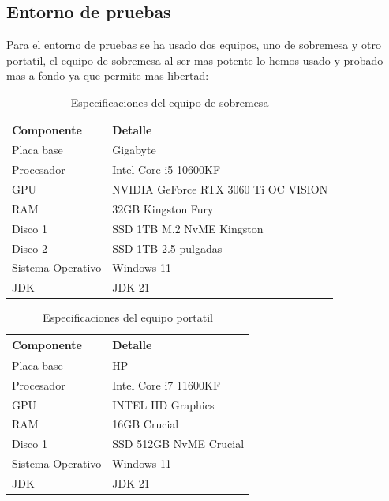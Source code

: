 \documentclass[a4paper]{article}
\begin{document}
\subsection{Entorno de pruebas}
Para el entorno de pruebas se ha usado dos equipos, uno de sobremesa y otro portatil, el equipo de sobremesa al ser mas potente lo hemos usado y probado mas a fondo ya que permite mas libertad: \\
\begin{table}[!htbp]
    \centering
    \caption{Especificaciones del equipo de sobremesa}
    \begin{tabular}{|l|l|}
        \hline
        \textbf{Componente} & \textbf{Detalle}                     \\
        \hline
        Placa base          & Gigabyte                             \\
        Procesador          & Intel Core i5 10600KF                \\
        GPU                 & NVIDIA GeForce RTX 3060 Ti OC VISION \\
        RAM                 & 32GB Kingston Fury                   \\
        Disco 1             & SSD 1TB M.2  NvME Kingston           \\
        Disco 2             & SSD 1TB 2.5 pulgadas                 \\
        Sistema Operativo   & Windows 11                           \\
        JDK                 & JDK 21                               \\
        \hline
    \end{tabular}
    \label{tab:equipo1}
\end{table}

\begin{table}[!htbp]
    \centering
    \caption{Especificaciones del equipo portatil}
    \begin{tabular}{|l|l|}
        \hline
        \textbf{Componente} & \textbf{Detalle}                     \\
        \hline
        Placa base          & HP                                   \\
        Procesador          & Intel Core i7 11600KF                \\
        GPU                 & INTEL HD Graphics                    \\
        RAM                 & 16GB Crucial                         \\
        Disco 1             & SSD 512GB NvME Crucial               \\
        Sistema Operativo   & Windows 11                           \\
        JDK                 & JDK 21                               \\
        \hline
    \end{tabular}
    \label{tab:equipo2}
\end{table}
\end{document}
